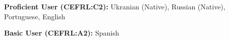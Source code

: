 

\begin{cventries}

  \cventry
    {}
    {}
    {}
    {} 
    {
	  \vspace{-0.5cm}
      \begin{cvitems} %
        \item[] {\hspace{-.31cm}\textbf{Proficient User (CEFRL:C2):} Ukranian (Native), Russian (Native), Portuguese, English}
        \item[] {\hspace{-.31cm}\textbf{Basic User (CEFRL:A2):} Spanish}
      \end{cvitems}
    }

\end{cventries}
